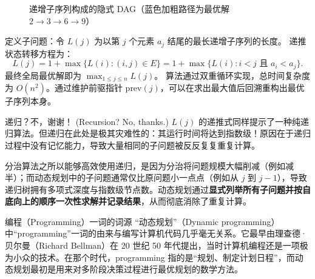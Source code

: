 \begin{figure}[htbp]
\centering
{}
\caption{递增子序列构成的隐式 DAG（蓝色加粗路径为最优解 $2 \to 3 \to 6 \to 9$）}
\label{fig:lis_dag}
\end{figure}

定义子问题：令 $L(j)$ 为以第 $j$ 个元素 $a_j$ 结尾的最长递增子序列的长度。
递推状态转移方程为：
\[
L(j) = 1 + \max \{L(i) : (i, j) \in E\} = 1 + \max \{L(i) : i < j \text{ 且 } a_i < a_j\}.
\]
最终全局最优解即为 $\max_{1 \le j \le n} L(j)$。
算法通过双重循环实现，总时间复杂度为 $O(n^2)$。通过维护前驱指针 $\text{prev}(j)$，可以在求出最大值后回溯重构出最优子序列本身。

\begin{sidebarbox}{递归？不，谢谢！ (Recursion? No, thanks.)}
$L(j)$ 的递推式同样提示了一种纯递归算法。但递归在此处是极其灾难性的：其运行时间将达到指数级！原因在于递归过程中没有记忆能力，导致大量相同的子问题被反反复复重复计算。

分治算法之所以能够高效使用递归，是因为分治将问题规模大幅削减（例如减半）；而动态规划中的子问题通常仅比原问题小一点点（例如从 $j$ 到 $j - 1$），导致递归树拥有多项式深度与指数级节点数。动态规划通过\textbf{显式列举所有子问题并按自底向上的顺序一次性求解并记录结果}，从而彻底消除了重复计算。
\end{sidebarbox}

\begin{sidebarbox}{编程（Programming）一词的词源}
“动态规划”（Dynamic programming）中“programming”一词的由来与编写计算机代码几乎毫无关系。它最早由理查德·贝尔曼（Richard Bellman）在 20 世纪 50 年代提出，当时计算机编程还是一项极为小众的技术。在那个时代，programming 指的是“规划、制定计划日程”，而动态规划最初是用来对多阶段决策过程进行最优规划的数学方法。
\end{sidebarbox}

